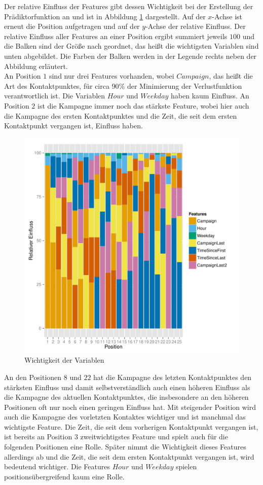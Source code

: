 Der relative Einfluss der Features gibt dessen Wichtigkeit bei der Erstellung der Prädiktorfunktion an und ist in Abbildung \ref{variable_importance} dargestellt. Auf der $x$-Achse ist erneut die Position aufgetragen und auf der $y$-Achse der relative Einfluss. Der relative Einfluss aller Features an einer Position ergibt summiert jeweils $100$ und die Balken sind der Größe nach geordnet, das heißt die wichtigsten Variablen sind unten abgebildet. Die Farben der Balken werden in der Legende rechts neben der Abbildung erläutert.\\
An Position $1$ sind nur drei Features vorhanden, wobei $Campaign$, das heißt die Art des Kontaktpunktes, für circa $90 \%$ der Minimierung der Verlustfunktion verantwortlich ist. Die Variablen $Hour$ und $Weekday$ haben kaum Einfluss. An Position $2$ ist die Kampagne immer noch das stärkste Feature, wobei hier auch die Kampagne des ersten Kontaktpunktes und die Zeit, die seit dem ersten Kontaktpunkt vergangen ist, Einfluss haben.\\
\begin{figure}[H]
	\centering\includegraphics[scale=0.9]{variableImportance.pdf}\caption{Wichtigkeit der Variablen}\label{variable_importance}
\end{figure}
An den Positionen $8$ und $22$ hat die Kampagne des letzten Kontaktpunktes den stärksten Einfluss und damit selbstverständlich auch einen höheren Einfluss als die Kampagne des aktuellen Kontaktpunktes, die insbesondere an den höheren Positionen oft nur noch einen geringen Einfluss hat. Mit steigender Position wird auch die Kampagne des vorletzten Kontaktes wichtiger und ist manchmal das wichtigste Feature. Die Zeit, die seit dem vorherigen Kontaktpunkt vergangen ist, ist bereits an Position $3$ zweitwichtigstes Feature und spielt auch für die folgenden Positionen eine Rolle. Später nimmt die Wichtigkeit dieses Features allerdings ab und die Zeit, die seit dem ersten Kontaktpunkt vergangen ist, wird bedeutend wichtiger. Die Features $Hour$ und $Weekday$ spielen positionsübergreifend kaum eine Rolle.\\
